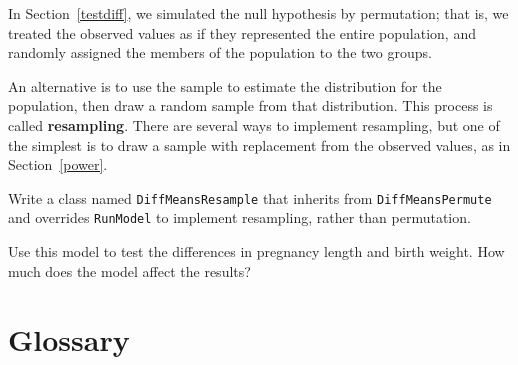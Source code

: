 \documentclass[12pt]{book}
\begin{document}
\begin{exercise}

In Section~\ref{testdiff}, we simulated the null hypothesis by
permutation; that is, we treated the observed values as if they
represented the entire population, and randomly assigned the
members of the population to the two groups.

An alternative is to use the sample to estimate the distribution for
the population, then draw a random sample from that distribution.
This process is called {\bf resampling}.  There are several ways to
implement resampling, but one of the simplest is to draw a sample
with replacement from the observed values, as in Section~\ref{power}.

Write a class named {\tt DiffMeansResample} that inherits from
{\tt DiffMeansPermute} and overrides {\tt RunModel} to implement
resampling, rather than permutation.

Use this model to test the differences in pregnancy length and
birth weight.  How much does the model affect the results?

\end{exercise}


\section{Glossary}
\end{document}
